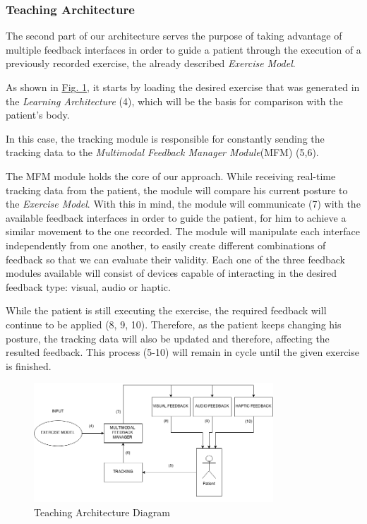 \documentclass[runningheads]{llncs}
\begin{document}
\subsubsection{Teaching Architecture}

The second part of our architecture serves the purpose of taking advantage of 
multiple feedback interfaces in order to guide a patient through 
the execution of a previously recorded exercise, the already described \emph{Exercise Model}.

As shown in \hyperref[fig:teaching]{Fig. \ref{fig:teaching}}, it starts by 
loading the desired exercise that was generated in the \emph{Learning Architecture} (4), which will be the basis for comparison with the patient's body.

In this case, the tracking module is responsible for constantly sending the tracking data to the \emph{Multimodal Feedback Manager Module}(MFM) (5,6).

The \ac{MFM} module holds the core of our approach. While receiving real-time tracking data from the patient, the module will compare his current posture to the \emph{Exercise Model}.
With this in mind, the module will communicate (7) with the available feedback interfaces in order to guide the patient, for him to achieve a similar movement to the one recorded.
The module will manipulate each interface independently from one another, to easily create different combinations of feedback so that we can evaluate their validity.
Each one of the three feedback modules available will consist of devices capable of interacting in the desired feedback type: visual, audio or haptic. 

While the patient is still executing the exercise, the required feedback will continue to be applied (8, 9, 10). Therefore, as the patient keeps changing his posture, the tracking data will also be updated and therefore, affecting the resulted feedback.
This process (5-10) will remain in cycle until the given exercise is finished.


\begin{figure}
	\centering
	\includegraphics[width=0.8\textwidth]{imgs/TeachingPhase}
	\caption{Teaching Architecture Diagram}
	\label{fig:teaching}
\end{figure}
\end{document}

